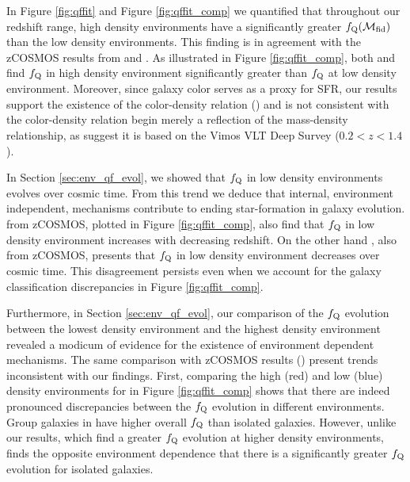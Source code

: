 \documentclass{emulateapj}
\begin{document}
In Figure \ref{fig:qffit} and Figure \ref{fig:qffit_comp} we
quantified that throughout our redshift range, high density
environments have a significantly greater
$f_{\rm{Q}}(\mathcal{M}_{\rm{fid}})$ than the low density
environments. This finding is in agreement with the zCOSMOS results
from \cite{Cucciati:2010aa} and \cite{Kovac:2014aa}. As illustrated in
Figure \ref{fig:qffit_comp}, both \cite{Cucciati:2010aa} and
\cite{Kovac:2014aa} find $f_{\rm{Q}}$ in high density environment
significantly greater than $f_{\rm{Q}}$ at low density
environment. Moreover, since galaxy color serves as a proxy for SFR,
our results support the existence of the color-density relation
(\citealt{Cucciati:2010aa, Cooper:2010aa}) and is not consistent with
the color-density relation begin merely a reflection of the
mass-density relationship, as \cite{Scodeggio:2009aa} suggest it is
based on the Vimos VLT Deep Survey ($0.2 < z< 1.4$).


In Section \ref{sec:env_qf_evol}, we showed that $f_{\rm{Q}}$ in
low density environments evolves over cosmic time. From this trend we
deduce that internal, environment independent, mechanisms contribute
to ending star-formation in galaxy evolution. \cite{Iovino:2010aa}
from zCOSMOS, plotted in Figure \ref{fig:qffit_comp}, also find that
$f_{\rm{Q}}$ in low density environment increases with decreasing redshift. On the other hand \cite{Kovac:2014aa}, also from zCOSMOS, presents that $f_{\rm{Q}}$ in low density environment decreases over cosmic time. This disagreement persists even when we account for the galaxy classification discrepancies in Figure \ref{fig:qffit_comp}. 

Furthermore, in Section \ref{sec:env_qf_evol}, our comparison of the
$f_{\rm{Q}}$ evolution between the lowest density environment and the
highest density environment revealed a modicum of evidence for the
existence of environment dependent mechanisms. The same comparison
with zCOSMOS results (\citealt{Iovino:2010aa, Kovac:2014aa}) present
trends inconsistent with our findings. First, comparing the high (red)
and low (blue) density environments for \cite{Iovino:2010aa} in Figure
\ref{fig:qffit_comp} shows that there are indeed pronounced
discrepancies between the $f_{\rm{Q}}$ evolution in different
environments. Group galaxies in \cite{Iovino:2010aa} have higher
overall $f_{\rm{Q}}$ than isolated galaxies. However, unlike our
results, which find a greater $f_{\rm{Q}}$ evolution at higher density
environments, \cite{Iovino:2010aa} finds the opposite environment
dependence that there is a significantly greater $f_{\rm{Q}}$
evolution for isolated galaxies.
\end{document}

